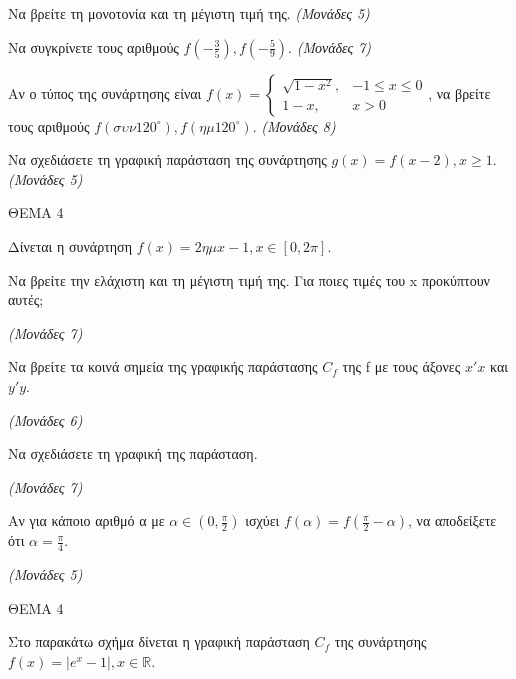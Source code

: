 \documentclass[11pt,a4paper,twoside]{book}
\newcommand{\monades}[1]{\hfill \textit{(Μονάδες #1)}}
\begin{document}
\begin{alist}
\item Να βρείτε τη μονοτονία και τη μέγιστη τιμή της.
\monades{5}

\item Να συγκρίνετε τους αριθμούς $f\left(-\frac{3}{5}\right), f\left(-\frac{5}{9}\right)$.
\monades{7}

\item Αν ο τύπος της συνάρτησης είναι $f(x) = \begin{cases} \sqrt{1 - x^2}, & -1 \leq x \leq 0 \\ 1 - x, & x > 0 \end{cases}$, να βρείτε τους αριθμούς $f(\sigma\upsilon\nu 120^\circ), f(\eta\mu 120^\circ)$.
\monades{8}

\item Να σχεδιάσετε τη γραφική παράσταση της συνάρτησης $g(x) = f(x - 2), x \geq 1$.
\monades{5}
\end{alist}

\vspace{4mm}

ΘΕΜΑ 4

Δίνεται η συνάρτηση $f(x) = 2\eta\mu x - 1, x \in [0, 2\pi]$.

\begin{alist}
\item Να βρείτε την ελάχιστη και τη μέγιστη τιμή της. Για ποιες τιμές του x προκύπτουν αυτές;

\monades{7}

\item Να βρείτε τα κοινά σημεία της γραφικής παράστασης $C_f$ της f με τους άξονες $x'x$ και $y'y$.

\monades{6}

\item Να σχεδιάσετε τη γραφική της παράσταση.

\monades{7}

\item Αν για κάποιο αριθμό α με $\alpha \in \left(0, \frac{\pi}{2}\right)$ ισχύει $f(\alpha) = f\left(\frac{\pi}{2} - \alpha\right)$, να αποδείξετε ότι $\alpha = \frac{\pi}{4}$.

\monades{5}
\end{alist}

\vspace{4mm}

ΘΕΜΑ 4

Στο παρακάτω σχήμα δίνεται η γραφική παράσταση $C_f$ της συνάρτησης $f(x) = |e^x - 1|, x \in \mathbb{R}$.
\end{document}
